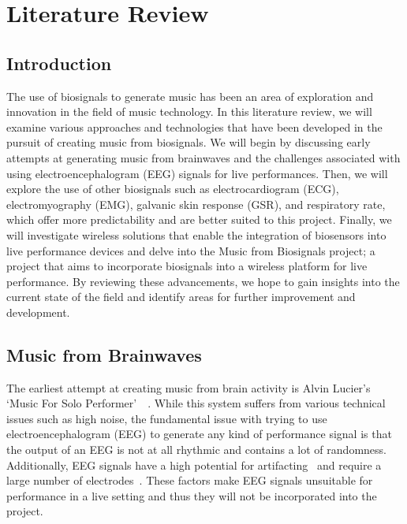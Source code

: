 \section{Literature Review}
\subsection{Introduction}
The use of biosignals to generate music has been an area of exploration and innovation in the field of music technology.
In this literature review, we will examine various approaches and technologies that have been developed in the pursuit of creating music from biosignals.
We will begin by discussing early attempts at generating music from brainwaves
and the challenges associated with using electroencephalogram (EEG) signals for live performances.
Then, we will explore the use of other biosignals such as electrocardiogram (ECG), electromyography (EMG), galvanic skin response (GSR), and respiratory rate,
which offer more predictability and are better suited to this project.
Finally, we will investigate wireless solutions that enable the integration of biosensors into live performance devices and
delve into the Music from Biosignals project; a project that aims to incorporate biosignals into a wireless platform for live performance.
By reviewing these advancements, we hope to gain insights into the current state of the field and identify areas for further improvement and development.

\subsection{Music from Brainwaves}
The earliest attempt at creating music from brain activity is Alvin Lucier's `Music For Solo Performer'~\cite{Lucier:2010}~\cite{Straebel:2014}.
While this system suffers from various technical issues such as high noise,
the fundamental issue with trying to use electroencephalogram (EEG) to generate any kind of performance signal
is that the output of an EEG is not at all rhythmic and contains a lot of randomness.
Additionally, EEG signals have a high potential for artifacting~\cite{Mannan:2018} and require a large number of electrodes~\cite{Piorecky:2019}.
These factors make EEG signals unsuitable for performance in a live setting and thus they will not be incorporated into the project.

